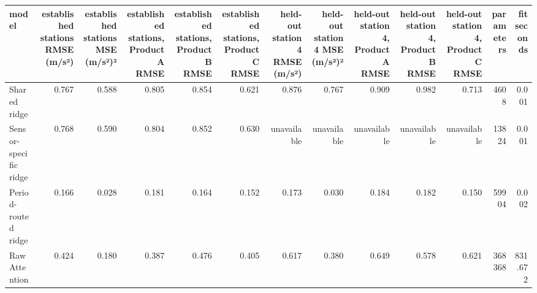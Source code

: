\begin{tabular}{lrrrrrrrrrrrr}
\toprule
model & established stations RMSE (m/s²) & established stations MSE (m/s²)² & established stations, Product A RMSE & established stations, Product B RMSE & established stations, Product C RMSE & held-out station 4 RMSE (m/s²) & held-out station 4 MSE (m/s²)² & held-out station 4, Product A RMSE & held-out station 4, Product B RMSE & held-out station 4, Product C RMSE & parameters & fit seconds \\
\midrule
Shared ridge & 0.767 & 0.588 & 0.805 & 0.854 & 0.621 & 0.876 & 0.767 & 0.909 & 0.982 & 0.713 & 4608 & 0.001 \\
Sensor-specific ridge & 0.768 & 0.590 & 0.804 & 0.852 & 0.630 & unavailable & unavailable & unavailable & unavailable & unavailable & 13824 & 0.001 \\
Period-routed ridge & 0.166 & 0.028 & 0.181 & 0.164 & 0.152 & 0.173 & 0.030 & 0.184 & 0.182 & 0.150 & 59904 & 0.002 \\
Raw Attention & 0.424 & 0.180 & 0.387 & 0.476 & 0.405 & 0.617 & 0.380 & 0.649 & 0.578 & 0.621 & 368368 & 831.672 \\
\bottomrule
\end{tabular}
